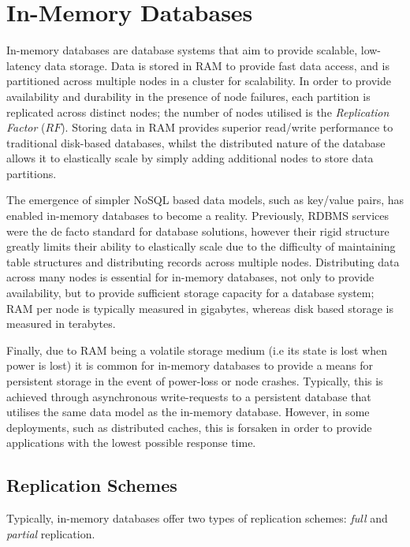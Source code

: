 \clearpage
\section{In-Memory Databases}
In-memory databases\citep{Infinispan, Hazelcast, GridGain, OracleCoherence, PivotalGemFire, Schiper:2010:PGP:1915085.1916444} are database systems that aim to provide scalable, low-latency data storage.  Data is stored in RAM to provide fast data access, and is partitioned across multiple nodes in a cluster for scalability.  In order to provide availability and durability in the presence of node failures, each partition is replicated across distinct nodes; the number of nodes utilised is the \emph{Replication Factor} ($RF$).  Storing data in RAM provides superior read/write performance to traditional disk-based databases, whilst the distributed nature of the database allows it to elastically scale by simply adding additional nodes to store data partitions.  

The emergence of simpler NoSQL based data models, such as key/value pairs, has enabled in-memory databases to become a reality.  Previously, RDBMS services were the de facto standard for database solutions, however their rigid structure greatly limits their ability to elastically scale due to the difficulty of maintaining table structures and distributing records across multiple nodes\citep{Cattell:2011:SSN:1978915.1978919, Cooper:2010:BCS:1807128.1807152}. Distributing data across many nodes is essential for in-memory databases, not only to provide availability, but to provide sufficient storage capacity for a database system; RAM per node is typically measured in gigabytes, whereas disk based storage is measured in terabytes.  

Finally, due to RAM being a volatile storage medium (i.e its state is lost when power is lost) it is common for in-memory databases to provide a means for persistent storage in the event of power-loss or node crashes.  Typically, this is achieved through asynchronous write-requests to a persistent database that utilises the same data model as the in-memory database.  However, in some deployments, such as distributed caches, this is forsaken in order to provide applications with the lowest possible response time.  
    
    \subsection{Replication Schemes}\label{replication_schemes}
	Typically, in-memory databases offer two types of replication schemes: \emph{full} and \emph{partial} replication.  
	
